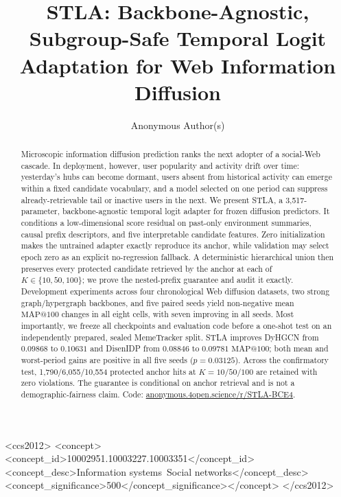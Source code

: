 \documentclass[sigconf,anonymous,review]{acmart}
\makeatletter
\newcommand{\method}{\textsc{STLA}\xspace}
\newcommand{\mapk}{\mathrm{MAP}@100}
\makeatother
\begin{document}
\title{STLA: Backbone-Agnostic, Subgroup-Safe Temporal Logit Adaptation for Web Information Diffusion}

\author{Anonymous Author(s)}

\begin{abstract}
Microscopic information diffusion prediction ranks the next adopter of a social-Web cascade. In deployment, however, user popularity and activity drift over time: yesterday's hubs can become dormant, users absent from historical activity can emerge within a fixed candidate vocabulary, and a model selected on one period can suppress already-retrievable tail or inactive users in the next. We present \method, a 3,517-parameter, backbone-agnostic temporal logit adapter for frozen diffusion predictors. It conditions a low-dimensional score residual on past-only environment summaries, causal prefix descriptors, and five interpretable candidate features. Zero initialization makes the untrained adapter exactly reproduce its anchor, while validation may select epoch zero as an explicit no-regression fallback. A deterministic hierarchical union then preserves every protected candidate retrieved by the anchor at each of $K\in\{10,50,100\}$; we prove the nested-prefix guarantee and audit it exactly. Development experiments across four chronological Web diffusion datasets, two strong graph/hypergraph backbones, and five paired seeds yield non-negative mean $\mapk$ changes in all eight cells, with seven improving in all seeds. Most importantly, we freeze all checkpoints and evaluation code before a one-shot test on an independently prepared, sealed MemeTracker split. \method improves DyHGCN from $0.09868$ to $0.10631$ and DisenIDP from $0.08846$ to $0.09781$ $\mapk$; both mean and worst-period gains are positive in all five seeds ($p=0.03125$). Across the confirmatory test, 1,790/6,055/10,554 protected anchor hits at $K=10/50/100$ are retained with zero violations. The guarantee is conditional on anchor retrieval and is not a demographic-fairness claim. Code: \href{https://anonymous.4open.science/r/STLA-BCE4}{anonymous.4open.science/r/STLA-BCE4}.
\end{abstract}


\begin{CCSXML}
<ccs2012>
<concept><concept_id>10002951.10003227.10003351</concept_id><concept_desc>Information systems~Social networks</concept_desc><concept_significance>500</concept_significance></concept>
</ccs2012>
\end{CCSXML}
\end{document}
